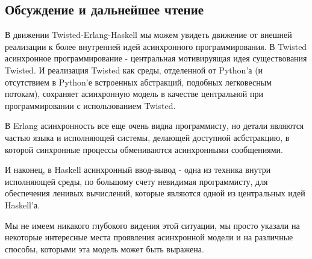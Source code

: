 \subsection{Обсуждение и дальнейшее чтение}

В движении Twisted-Erlang-Haskell мы можем увидеть движение
от внешней реализации к более внутренней 
идей асинхронного программирования. В Twisted асинхронное программирование - 
центральная мотивируящая идея существования Twisted. И 
реализация Twisted как среды, отделенной от Python'а (и отсутствием 
в Python'е встроенных абстракций, подобных легковесным потокам), 
сохраняет асинхронную модель в качестве центральной при 
программировании с использованием Twisted. 


В Erlang асинхронность все еще очень видна 
программисту, но детали являются частью 
языка и исполняющей системы, делающей доступной 
асбстракцию, в которой синхронные процессы 
обмениваются асинхронными сообщениями.  


И наконец, в Haskell асинхронный ввод-вывод - одна из техника 
внутри исполняющей среды, по большому счету невидимая программисту, 
для обеспечения ленивых вычислений, которые являются одной  
из центральных идей Haskell'а.


Мы не имеем никакого глубокого видения этой ситуации, мы просто 
указали на некоторые интересные места проявления асинхронной 
модели и на различные способы, которыми эта модель может быть выражена.


